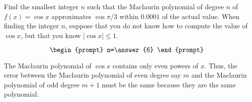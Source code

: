 \documentclass{ximera}
\author{Gregory Hartman \and Matthew Carr}
\begin{document}
\begin{exercise}





Find the smallest integer $n$ such that the Maclaurin polynomial of degree $n$ of $f(x)=\cos x$ approximates $\cos \pi/3$ within $0.0001$ of the actual value. When finding the integer $n$, suppose that you do not know how to compute the value of $\cos x$, but that you know $|\cos x|\le 1$.

\[
\begin{prompt}
n=\answer{6}
\end{prompt}
\]

\begin{hint}
The Maclaurin polynomial of $\cos x$ contains only even powers of $x$. Thus, the error between the Maclaurin polynomial of even degree say $m$ and the Maclaurin polynomial of odd degree $m+1$ must be the same because they are the same polynomial.
\end{hint}

\end{exercise}
\end{document}
